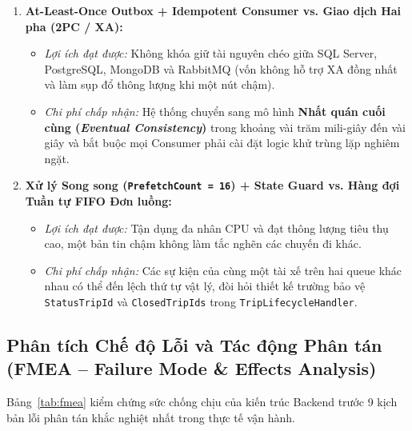 \documentclass[12pt,a4paper]{article}
\begin{document}
\begin{enumerate}[leftmargin=1.5em]
\begin{itemize}[nosep]
        \item \textit{Chi phí chấp nhận:} API tạo chuyến và xác nhận chuyến trả \texttt{202 Accepted} thay vì trả ngay giá/lời mời trong cùng một vòng HTTP; client cần thực hiện polling \texttt{GET /trips/\{id\}} và consumer phải kiểm tra bỏ qua kết quả báo giá/ghép xe đến muộn sau khi chuyến đã bị hủy.
    \end{itemize}
    \item \textbf{At-Least-Once Outbox + Idempotent Consumer vs. Giao dịch Hai pha (2PC / XA):}
    \begin{itemize}[nosep]
        \item \textit{Lợi ích đạt được:} Không khóa giữ tài nguyên chéo giữa SQL Server, PostgreSQL, MongoDB và RabbitMQ (vốn không hỗ trợ XA đồng nhất và làm sụp đổ thông lượng khi một nút chậm).
        \item \textit{Chi phí chấp nhận:} Hệ thống chuyển sang mô hình \textbf{Nhất quán cuối cùng (\textit{Eventual Consistency})} trong khoảng vài trăm mili-giây đến vài giây và bắt buộc mọi Consumer phải cài đặt logic khử trùng lặp nghiêm ngặt.
    \end{itemize}
    \item \textbf{Xử lý Song song (\texttt{PrefetchCount = 16}) + State Guard vs. Hàng đợi Tuần tự FIFO Đơn luồng:}
    \begin{itemize}[nosep]
        \item \textit{Lợi ích đạt được:} Tận dụng đa nhân CPU và đạt thông lượng tiêu thụ cao, một bản tin chậm không làm tắc nghẽn các chuyến đi khác.
        \item \textit{Chi phí chấp nhận:} Các sự kiện của cùng một tài xế trên hai queue khác nhau có thể đến lệch thứ tự vật lý, đòi hỏi thiết kế trường bảo vệ \texttt{StatusTripId} và \texttt{ClosedTripIds} trong \texttt{TripLifecycleHandler}.
    \end{itemize}
\end{enumerate}

\subsection{Phân tích Chế độ Lỗi và Tác động Phân tán (FMEA -- Failure Mode \& Effects Analysis)}
Bảng~\ref{tab:fmea} kiểm chứng sức chống chịu của kiến trúc Backend trước 9 kịch bản lỗi phân tán khắc nghiệt nhất trong thực tế vận hành.
\end{document}
